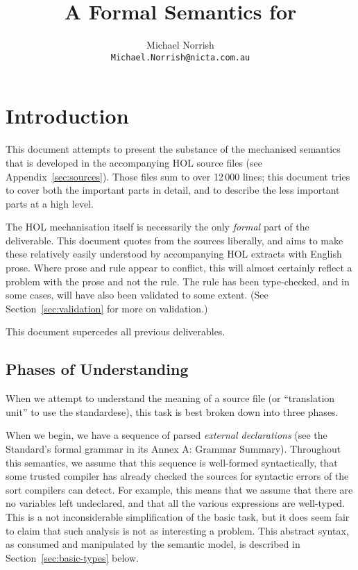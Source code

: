 \documentclass[11pt]{article}
\title{A Formal Semantics for \cpp}
\author{Michael Norrish\\{\small \texttt{Michael.Norrish@nicta.com.au}}}
\date{}
\begin{document}
\maketitle
\tableofcontents

\section{Introduction}

This document attempts to present the substance of the mechanised
\cpp{} semantics that is developed in the accompanying HOL source
files (see Appendix~\ref{sec:sources}).  Those files sum to over
12$\,$000 lines; this document tries to cover both the important parts
in detail, and to describe the less important parts at a high level.

The HOL mechanisation itself is necessarily the only \emph{formal}
part of the deliverable.  This document quotes from the sources
liberally, and aims to make these relatively easily understood by
accompanying HOL extracts with English prose.  Where prose and rule
appear to conflict, this will almost certainly reflect a problem with
the prose and not the rule.  The rule has been type-checked, and in
some cases, will have also been validated to some extent.  (See
Section~\ref{sec:validation} for more on validation.)

This document supercedes all previous deliverables.

\subsection{Phases of Understanding}

When we attempt to understand the meaning of a \cpp{} source file (or
``translation unit'' to use the standardese), this task is best broken
down into three phases.

When we begin, we have a sequence of parsed \emph{external
  declarations} (see the Standard's formal grammar in its Annex A:
Grammar Summary).  Throughout this semantics, we assume that this
sequence is well-formed syntactically, that some trusted compiler has
already checked the sources for syntactic errors of the sort compilers
can detect.  For example, this means that we assume that there are no
variables left undeclared, and that all the various expressions are
well-typed.  This is a not inconsiderable simplification of the basic
task, but it does seem fair to claim that such analysis is not as
interesting a problem.  This abstract syntax, as consumed and
manipulated by the semantic model, is described in
Section~\ref{sec:basic-types} below.
\end{document}
